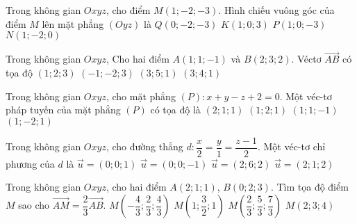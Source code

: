 \begin{ex}%
	Trong không gian $ Oxyz  $, cho điểm $ M(1;-2;-3) $. Hình chiếu vuông góc của điểm $ M $ lên mặt phẳng $ (Oyz) $ là
	\choice
	{\True $ Q(0;-2;-3) $}
	{$ K(1;0;3) $}
	{$ P(1;0;-3) $}
	{$ N(1;-2;0) $}
\end{ex}

\begin{ex}%
	Trong không gian $Oxyz$, Cho hai điểm $A(1;1;-1)$ và $B(2;3;2)$. Véctơ $\vec{AB}$ có tọa độ
	\choice
	{\True $(1;2;3)$}
	{$(-1;-2;3)$}
	{$(3;5;1)$}
	{$(3;4;1)$}
\end{ex}


\begin{ex}%
	Trong không gian $Oxyz$, cho mặt phẳng $(P)\colon x+y-z+2=0$. Một véc-tơ pháp tuyến của mặt phẳng $(P)$ có tọa độ là
	\choice
	{$(2;1;1)$}
	{$(1;2;1)$}
	{\True $(1;1;-1)$}
	{$(1;-2;1)$}
\end{ex}


\begin{ex}%
	Trong không gian $Oxyz$, cho đường thẳng $d\colon \dfrac{x}{2}=\dfrac{y}{1}=\dfrac{z-1}{2}$. Một véc-tơ chỉ phương của $d$ là
	\choice
	{$\vec{u}=(0;0;1)$}
	{$\vec{u}=(0;0;-1)$}
	{$\vec{u}=(2;6;2)$}
	{\True $\vec{u}=(2;1;2)$}
\end{ex}


\begin{ex}%
	Trong không gian $Oxyz$, cho hai điểm $A(2;1;1)$, $B(0;2;3)$. Tìm tọa độ điểm $M$ sao cho $\overrightarrow{AM}=\dfrac{2}{3}\overrightarrow{AB}$.
	\choice
	{$M\left(-\dfrac{4}{3};\dfrac{2}{3};\dfrac{4}{3}\right)$}
	{$M\left(1;\dfrac{3}{2};1\right)$}
	{\True $M\left(\dfrac{2}{3};\dfrac{5}{3};\dfrac{7}{3}\right)$}
	{$M\left(2;3;4\right)$}
\end{ex}



